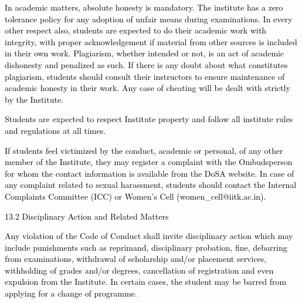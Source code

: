 \documentclass[12pt]{article}
\begin{document}
\vspace{\baselineskip}
\begin{justify}
{\fontsize{10pt}{12.0pt}\selectfont \textcolor[HTML]{00000A}{In academic matters, absolute honesty is mandatory. The institute has a zero tolerance policy for any adoption of unfair means during examinations. In every other respect also, students are expected to do their academic work with integrity, with proper acknowledgement if material from other sources is included in their own work. Plagiarism, whether intended or not, is an act of academic dishonesty and penalized as such. If there is any doubt about what constitutes plagiarism, students should consult their instructors to ensure maintenance of academic honesty in their work. Any case of cheating will be dealt with strictly by the Institute.}\par}
\end{justify}\par


\vspace{\baselineskip}
{\fontsize{10pt}{12.0pt}\selectfont \textcolor[HTML]{00000A}{Students are expected to respect Institute property and follow all institute rules and regulations at all times.}\par}\par


\vspace{\baselineskip}
\begin{justify}
{\fontsize{10pt}{12.0pt}\selectfont \textcolor[HTML]{00000A}{If students feel victimized by the conduct, academic or personal, of any other member of the Institute, they may register a complaint with the Ombudsperson for whom the contact information is available from the DoSA website. In case of any complaint related to sexual harassment, students should contact the Internal Complaints Committee (ICC) or Women’s Cell (women\_cell@iitk.ac.in).}\par}
\end{justify}\par


\vspace{\baselineskip}
\textcolor[HTML]{00000A}{13.2 Disciplinary Action and Related Matters}\par


\vspace{\baselineskip}
\begin{justify}
{\fontsize{10pt}{12.0pt}\selectfont \textcolor[HTML]{00000A}{Any violation of the Code of Conduct shall invite disciplinary action which may include punishments such as reprimand, disciplinary probation, fine, debarring from examinations, withdrawal of scholarship and/or placement services, withholding of grades and/or degrees, cancellation of registration and even expulsion from the Institute. In certain cases, the student may be barred from applying for a change of programme.}\par}
\end{justify}\par
\end{document}
